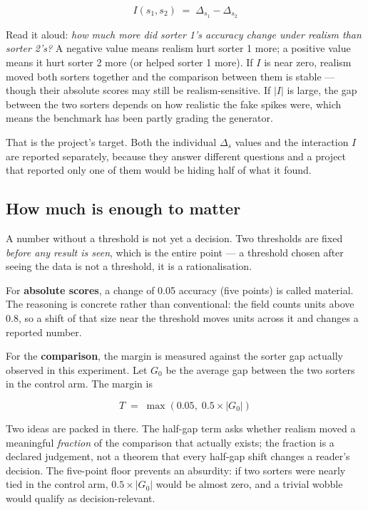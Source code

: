 \documentclass[12pt]{article}
\begin{document}
\[
I(s_1, s_2) \;=\; \Delta_{s_1} - \Delta_{s_2}
\]

Read it aloud: \emph{how much more did sorter 1's accuracy change under realism than sorter
2's?} A negative value means realism hurt sorter 1 more; a positive value means it hurt
sorter 2 more (or helped sorter 1 more). If $I$ is near zero, realism moved both sorters
together and the comparison between them is stable --- though their absolute scores may
still be realism-sensitive. If $|I|$ is large, the gap between the two sorters depends on how
realistic the fake spikes were, which means the benchmark has been partly grading the
generator.

That is the project's target. Both the individual $\Delta_s$ values and the interaction $I$
are reported separately, because they answer different questions and a project that reported
only one of them would be hiding half of what it found.

\subsection{How much is enough to matter}

A number without a threshold is not yet a decision. Two thresholds are fixed \emph{before any
result is seen}, which is the entire point --- a threshold chosen after seeing the data is not
a threshold, it is a rationalisation.

For \textbf{absolute scores}, a change of 0.05 accuracy (five points) is called material. The
reasoning is concrete rather than conventional: the field counts units above 0.8, so a shift
of that size near the threshold moves units across it and changes a reported number.

For the \textbf{comparison}, the margin is measured against the sorter gap actually observed
in this experiment. Let $G_0$ be the average gap between the two sorters in the control arm.
The margin is

\[
T \;=\; \max(0.05,\; 0.5 \times |G_0|)
\]

Two ideas are packed in there. The half-gap term asks whether realism moved a meaningful
\emph{fraction} of the comparison that actually exists; the fraction is a declared judgement,
not a theorem that every half-gap shift changes a reader's decision. The five-point floor
prevents an absurdity: if two sorters were nearly tied in the control arm,
$0.5 \times |G_0|$ would be almost zero, and a trivial wobble would qualify as
decision-relevant.
\end{document}
